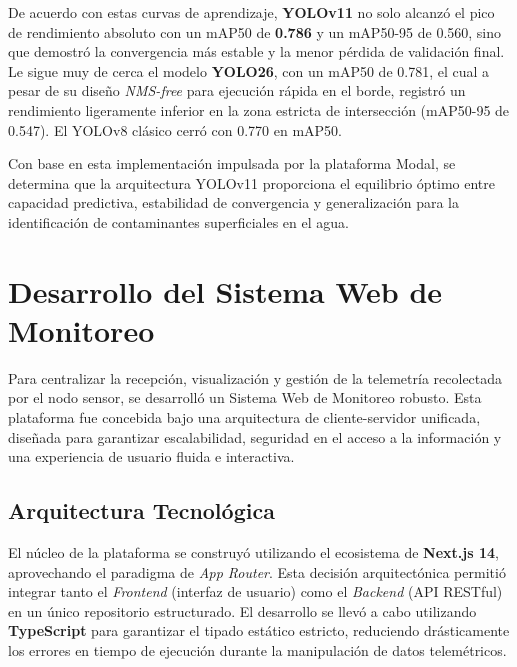 De acuerdo con estas curvas de aprendizaje, \textbf{YOLOv11} no solo alcanzó el pico de rendimiento absoluto con un mAP50 de \textbf{\num{0.786}} y un mAP50-95 de \num{0.560}, sino que demostró la convergencia más estable y la menor pérdida de validación final. Le sigue muy de cerca el modelo \textbf{YOLO26}, con un mAP50 de \num{0.781}, el cual a pesar de su diseño \textit{NMS-free} para ejecución rápida en el borde, registró un rendimiento ligeramente inferior en la zona estricta de intersección (mAP50-95 de \num{0.547}). El YOLOv8 clásico cerró con \num{0.770} en mAP50.

Con base en esta implementación impulsada por la plataforma Modal, se determina que la arquitectura YOLOv11 proporciona el equilibrio óptimo entre capacidad predictiva, estabilidad de convergencia y generalización para la identificación de contaminantes superficiales en el agua.

\section{Desarrollo del Sistema Web de Monitoreo}
\label{sec:desarrollo_del_sistema_web_de_monitoreo}

Para centralizar la recepción, visualización y gestión de la telemetría recolectada por el nodo sensor, se desarrolló un Sistema Web de Monitoreo robusto. Esta plataforma fue concebida bajo una arquitectura de cliente-servidor unificada, diseñada para garantizar escalabilidad, seguridad en el acceso a la información y una experiencia de usuario fluida e interactiva.

\subsection{Arquitectura Tecnológica}
\label{subsec:arquitectura_tecnologica}

El núcleo de la plataforma se construyó utilizando el ecosistema de \textbf{Next.js 14}, aprovechando el paradigma de \textit{App Router}. Esta decisión arquitectónica permitió integrar tanto el \textit{Frontend} (interfaz de usuario) como el \textit{Backend} (API RESTful) en un único repositorio estructurado. El desarrollo se llevó a cabo utilizando \textbf{TypeScript} para garantizar el tipado estático estricto, reduciendo drásticamente los errores en tiempo de ejecución durante la manipulación de datos telemétricos. 

